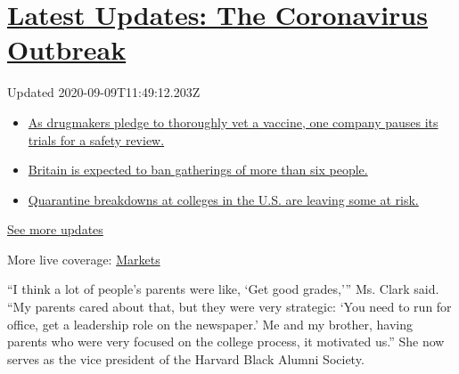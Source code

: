 \hypertarget{latest-updates-the-coronavirus-outbreak}{%
\section{\texorpdfstring{\href{https://www.nytimes3xbfgragh.onion/2020/09/09/world/covid-19-coronavirus.html?action=click\&pgtype=Article\&state=default\&region=MAIN_CONTENT_1\&context=storylines_live_updates}{Latest
Updates: The Coronavirus
Outbreak}}{Latest Updates: The Coronavirus Outbreak}}\label{latest-updates-the-coronavirus-outbreak}}

Updated 2020-09-09T11:49:12.203Z

\begin{itemize}
\tightlist
\item
  \href{https://www.nytimes3xbfgragh.onion/2020/09/09/world/covid-19-coronavirus.html?action=click\&pgtype=Article\&state=default\&region=MAIN_CONTENT_1\&context=storylines_live_updates\#link-70cea8bb}{As
  drugmakers pledge to thoroughly vet a vaccine, one company pauses its
  trials for a safety review.}
\item
  \href{https://www.nytimes3xbfgragh.onion/2020/09/09/world/covid-19-coronavirus.html?action=click\&pgtype=Article\&state=default\&region=MAIN_CONTENT_1\&context=storylines_live_updates\#link-780eaa2f}{Britain
  is expected to ban gatherings of more than six people.}
\item
  \href{https://www.nytimes3xbfgragh.onion/2020/09/09/world/covid-19-coronavirus.html?action=click\&pgtype=Article\&state=default\&region=MAIN_CONTENT_1\&context=storylines_live_updates\#link-11cec4c0}{Quarantine
  breakdowns at colleges in the U.S. are leaving some at risk.}
\end{itemize}

\href{https://www.nytimes3xbfgragh.onion/2020/09/09/world/covid-19-coronavirus.html?action=click\&pgtype=Article\&state=default\&region=MAIN_CONTENT_1\&context=storylines_live_updates}{See
more updates}

More live coverage:
\href{https://www.nytimes3xbfgragh.onion/live/2020/09/09/business/stock-market-today-coronavirus?action=click\&pgtype=Article\&state=default\&region=MAIN_CONTENT_1\&context=storylines_live_updates}{Markets}

``I think a lot of people's parents were like, `Get good grades,''' Ms.
Clark said. ``My parents cared about that, but they were very strategic:
`You need to run for office, get a leadership role on the newspaper.' Me
and my brother, having parents who were very focused on the college
process, it motivated us.'' She now serves as the vice president of the
Harvard Black Alumni Society.

